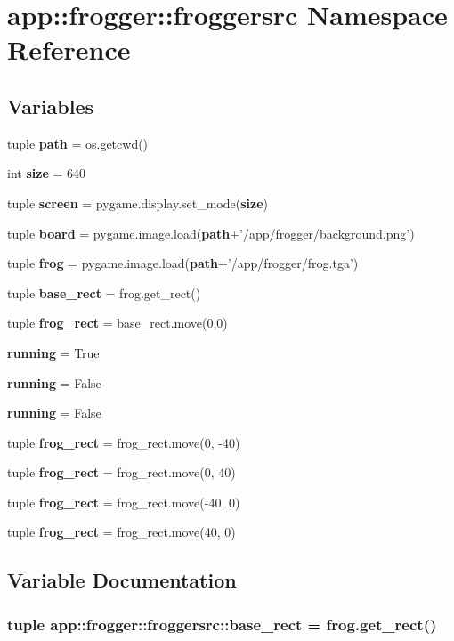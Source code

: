 \section{app::frogger::froggersrc Namespace Reference}
\label{namespaceapp_1_1frogger_1_1froggersrc}


\subsection*{Variables}
\begin{CompactItemize}
\item 
tuple {\bf path} = os.getcwd()
\item 
int {\bf size} = 640
\item 
tuple {\bf screen} = pygame.display.set\_\-mode({\bf size})
\item 
tuple {\bf board} = pygame.image.load({\bf path}+'/app/frogger/background.png')
\item 
tuple {\bf frog} = pygame.image.load({\bf path}+'/app/frogger/frog.tga')
\item 
tuple {\bf base\_\-rect} = frog.get\_\-rect()
\item 
tuple {\bf frog\_\-rect} = base\_\-rect.move(0,0)
\item 
{\bf running} = True
\item 
{\bf running} = False
\item 
{\bf running} = False
\item 
tuple {\bf frog\_\-rect} = frog\_\-rect.move(0, -40)
\item 
tuple {\bf frog\_\-rect} = frog\_\-rect.move(0, 40)
\item 
tuple {\bf frog\_\-rect} = frog\_\-rect.move(-40, 0)
\item 
tuple {\bf frog\_\-rect} = frog\_\-rect.move(40, 0)
\end{CompactItemize}


\subsection{Variable Documentation}
\subsubsection{\setlength{\rightskip}{0pt plus 5cm}tuple {\bf app::frogger::froggersrc::base\_\-rect} = frog.get\_\-rect()\hspace{0.3cm}{\tt  [static]}}\label{namespaceapp_1_1frogger_1_1froggersrc_bda30401b9f460ea1b0b4dde239aba9e}




